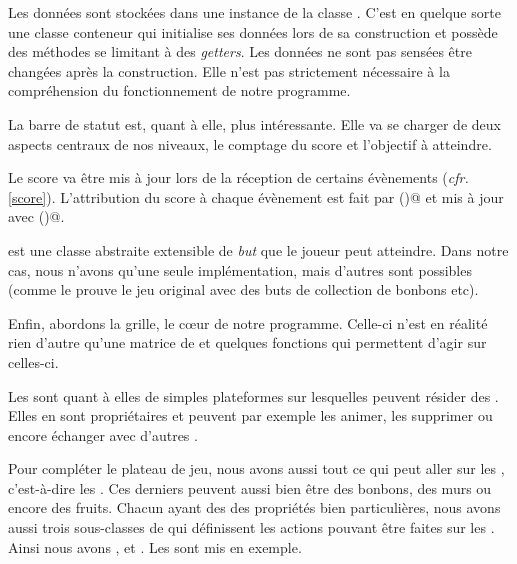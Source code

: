 \documentclass[11pt,a4paper]{article}
\newcommand{\addcode}[3]{
	\begin{center}
		
	\end{center}
}
\begin{document}
Les données sont stockées dans une instance de la classe
\verb@LevelData@. C'est en quelque sorte une classe
conteneur qui initialise ses données lors de sa construction
et possède des méthodes se limitant à des \emph{getters}.
Les données ne sont pas sensées être changées après la
construction. Elle n'est pas strictement nécessaire à la compréhension
du fonctionnement de notre programme.

La barre de statut est, quant à elle, plus intéressante.
Elle va se charger de deux aspects centraux de nos niveaux, le
comptage du score et l'objectif à atteindre.

Le score va être mis à jour lors de la réception de certains
évènements (\emph{cfr.} \ref{score}). L'attribution du score
à chaque évènement est fait par \verb@scoreValueOf()@ et mis
à jour avec \verb@updateScore()@.

\addcode{code/levelStatus.hpp}{C++}{}{}

\verb@LevelGoal@ est une classe abstraite extensible de \emph{but} que le
joueur peut atteindre. Dans notre cas, nous n'avons qu'une
seule implémentation, mais d'autres sont possibles (comme le
prouve le jeu original avec des buts de collection de
bonbons etc). 

\addcode{code/levelGoal.hpp}{C++}{}{}
\addcode{code/eventOccurGoal.hpp}{C++}{}{}

Enfin, abordons la grille, le cœur de notre programme.
Celle-ci n'est en réalité rien d'autre qu'une matrice de \verb@Cell@
et quelques fonctions qui permettent d'agir sur celles-ci.

\addcode{code/grid.hpp}{C++}{}{}

Les \verb@Cell@s sont quant à elles de simples plateformes
sur lesquelles peuvent résider des \verb@CellContent@.
Elles en sont propriétaires et peuvent par exemple les
animer, les supprimer ou encore échanger avec d'autres
\verb@Cell@.

\addcode{code/cell.hpp}{C++}{}{}

Pour compléter le plateau de jeu, nous avons aussi tout ce
qui peut aller sur les \verb@Cell@, c'est-à-dire les
\verb@CellContent@s. Ces derniers peuvent aussi bien être
des bonbons, des murs ou encore des fruits. Chacun ayant des
des propriétés bien particulières, nous avons aussi trois
sous-classes de \verb@CellContent@ qui définissent les
actions pouvant être faites sur les \verb@CellContent@.
Ainsi nous avons \verb@MovableCellContent@,
\verb@ClearableCellContent@ et \verb@MatchableCellContent@.
Les \verb@Fruit@ sont mis en exemple.
\end{document}
